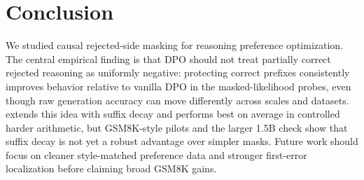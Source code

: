 \section{Conclusion}

We studied causal rejected-side masking for reasoning preference optimization. The central empirical finding is that DPO should not treat partially correct rejected reasoning as uniformly negative: protecting correct prefixes consistently improves behavior relative to vanilla DPO in the masked-likelihood probes, even though raw generation accuracy can move differently across scales and datasets. \cmdpo{} extends this idea with suffix decay and performs best on average in controlled harder arithmetic, but GSM8K-style pilots and the larger 1.5B check show that suffix decay is not yet a robust advantage over simpler masks. Future work should focus on cleaner style-matched preference data and stronger first-error localization before claiming broad GSM8K gains.
